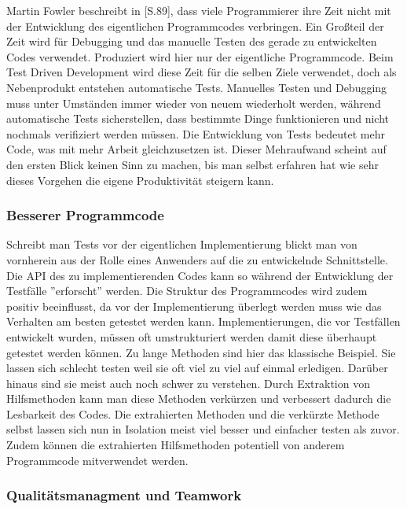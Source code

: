 Martin Fowler beschreibt in \cite{fowler99refactoring}[S.89], dass
viele Programmierer ihre Zeit nicht mit der Entwicklung des
eigentlichen Programmcodes verbringen. Ein Großteil der Zeit wird für
Debugging und das manuelle Testen des gerade zu entwickelten Codes
verwendet. Produziert wird hier nur der eigentliche Programmcode. Beim
Test Driven Development wird diese Zeit für die selben Ziele
verwendet, doch als Nebenprodukt entstehen automatische
Tests. Manuelles Testen und Debugging muss unter Umständen immer
wieder von neuem wiederholt werden, während automatische Tests
sicherstellen, dass bestimmte Dinge funktionieren und nicht nochmals
verifiziert werden müssen. Die Entwicklung von Tests bedeutet mehr
Code, was mit mehr Arbeit gleichzusetzen ist. Dieser Mehraufwand
scheint auf den ersten Blick keinen Sinn zu machen, bis man selbst
erfahren hat wie sehr dieses Vorgehen die eigene Produktivität
steigern kann.

\subsubsection{Besserer Programmcode}

Schreibt man Tests vor der eigentlichen Implementierung blickt man von
vornherein aus der Rolle eines Anwenders auf die zu entwickelnde
Schnittstelle. Die API des zu implementierenden Codes kann so während
der Entwicklung der Testfälle ''erforscht'' werden. Die Struktur des
Programmcodes wird zudem positiv beeinflusst, da vor der
Implementierung überlegt werden muss wie das Verhalten am besten
getestet werden kann. Implementierungen, die vor Testfällen entwickelt
wurden, müssen oft umstrukturiert werden damit diese überhaupt
getestet werden können. Zu lange Methoden sind hier das klassische
Beispiel. Sie lassen sich schlecht testen weil sie oft viel zu viel
auf einmal erledigen. Darüber hinaus sind sie meist auch noch schwer
zu verstehen. Durch Extraktion von Hilfsmethoden kann man diese
Methoden verkürzen und verbessert dadurch die Lesbarkeit des
Codes. Die extrahierten Methoden und die verkürzte Methode selbst
lassen sich nun in Isolation meist viel besser und einfacher testen
als zuvor. Zudem können die extrahierten Hilfsmethoden potentiell von
anderem Programmcode mitverwendet werden.

\subsubsection{Qualitätsmanagment und Teamwork}


